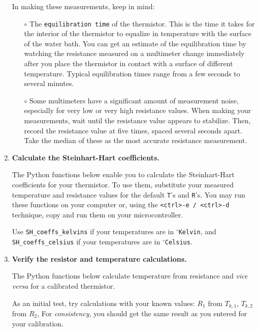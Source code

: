 \begin{enumerate}
	In making these measurements, keep in mind:
	\begin{itemize}
		\item[$\circ$] The \texttt{equilibration time} of the thermistor. 
		This is the time it takes for the interior of the thermistor to equalize in temperature with the surface of the water bath.
		You can get an estimate of the equilibration time by watching the resistance measured on a multimeter change immediately after you place the thermistor in contact with a surface of different temperature. 
		Typical equilibration times range from a few seconds to several minutes.
		\item[$\circ$] %
		Some multimeters have a significant amount of measurement noise, especially for very low or very high resistance values. 
		When making your measurements, wait until the resistance value appears to stabilize. 
		Then, record the resistance value at five times, spaced several seconds apart. 
		Take the median of these as the most accurate resistance measurement. 
	\end{itemize}	
	
	\item \textbf{Calculate the Steinhart-Hart coefficients.}
	
	The Python functions below enable you to calculate the Steinhart-Hart coefficients for your thermistor.
	To use them, substitute your measured temperature and resistance values for the default \texttt{T}'s and \texttt{R}'s.
	You may run these functions on your computer or, using the \texttt{<ctrl>-e / <ctrl>-d} technique, copy and run them on your microcontroller.
	
	\smallskip
	Use \lstinline{SH_coeffs_kelvins} if your temperatures are in $^\circ$\texttt{Kelvin}, and \lstinline{SH_coeffs_celsius} if your temperatures are in $^\circ$\texttt{Celsius}.
	
	
	
	
	
	\item \textbf{Verify the resistor and temperature calculations.}
	
	The Python functions below calculate temperature from resistance and \textit{vice versa} for a calibrated thermistor.
	
	As an initial test, try calculations with your known values: $R_1$ from $T_{k,1}$, $T_{k,2}$ from $R_2$, \etc
	For \emph{consistency}, you should get the same result as you entered for your calibration.
	

\end{enumerate}
